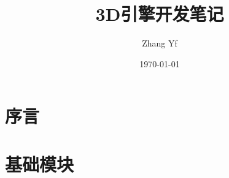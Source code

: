 \documentclass[
    UTF8,       %
    b5paper,    %
    10pt,       %
    oneside,    %
    openany,    %
    final]      %
    {ctexbook}
\title{3D引擎开发笔记}
\author{Zhang Yf}
\date{\today}
\begin{document}
    \maketitle
    \tableofcontents

    \maketitle
    \part{序言}

    

    \maketitle
    \part{基础模块}

    
\end{document}
